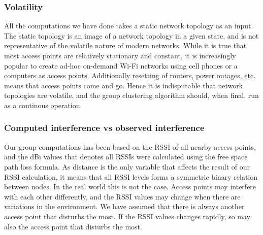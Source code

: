 \subsubsection{Volatility} 
All the computations we have done takes a static network topology as an input. The static topology is an image of a network topology in a given state, and is not representative
of the volatile nature of modern networks. While it is true that most access points are relatively stationary and constant, it is increasingly popular to create
ad-hoc on-demand Wi-Fi networks using cell phones or a computers as access points. Additionally resetting of routers, power outages, etc. means that access points come and go. 
Hence it is indisputable that network topologies are volatile, and the group clustering algorithm should, when final, run as a continous operation. 

\subsubsection{Computed interference vs observed interference}
Our group computations has been based on the RSSI of all nearby access points, and the dBi values that denotes all RSSIs were calculated using the free space path loss formula.
As distance is the only variable that affects the result of our RSSI calculation, it means that all RSSI levels forms a symmetric binary relation between nodes. In the real world 
this is not the case. Access points may interfere with each other differently, and the RSSI values may change when there are variations in the environment. We have assumed
that there is always another access point that disturbs the most. If the RSSI values changes rapidly, so may also the access point that disturbs the most. 

